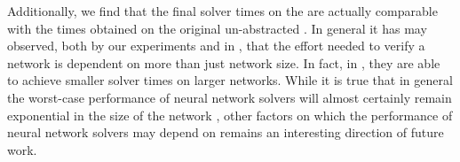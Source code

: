 Additionally, we find that the final solver times on the \abs are actually
comparable with the times obtained on the original un-abstracted \cnc. In
general it has may observed, both by our experiments and in \cite{cegar-nn},
that the effort needed to verify a network is dependent
on more than just network size. In fact, in \cite{cegar-nn},
they are able to achieve smaller solver times on larger networks. 
While it is true that in general the worst-case performance of neural network
solvers will almost certainly remain exponential in the size of the network
\cite{reluplex}, other factors on which the performance of neural network
solvers may depend on remains an interesting direction of future work. 

